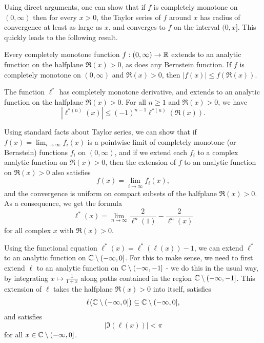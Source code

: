 \documentclass[letterpaper,11pt]{article}
\begin{document}
Using direct arguments, one can show that if $f$ is completely monotone on $(0,\infty)$ then for every $x > 0$, the Taylor series of $f$ around $x$ has radius of convergence at least as large as $x$, and converges to $f$ on the interval $(0,x]$. This quickly leads to the following result.

\begin{prop} Every completely monotone function $f : (0,\infty) \rightarrow \mathbb{R}$ extends to an analytic function on the halfplane $\Re(x) > 0$, as does any Bernstein function. If $f$ is completely monotone on $(0,\infty)$ and $\Re(x) > 0$, then $|f(x)| \le f(\Re(x))$.
\end{prop}

\begin{cor} The function $\ell^*$ has completely monotone derivative, and extends to an analytic function on the halfplane $\Re(x) > 0$. For all $n \ge 1$ and $\Re(x) > 0$, we have
\[
|\ell^{*(n)}(x)| \le (-1)^{n-1}\ell^{*(n)}(\Re(x)).
\]
\end{cor}

Using standard facts about Taylor series, we can show that if $f(x) = \lim_{i\rightarrow \infty} f_i(x)$ is a pointwise limit of completely monotone (or Bernstein) functions $f_i$ on $(0,\infty)$, and if we extend each $f_i$ to a complex analytic function on $\Re(x) > 0$, then the extension of $f$ to an analytic function on $\Re(x) > 0$ also satisfies
\[
f(x) = \lim_{i\rightarrow \infty} f_i(x),
\]
and the convergence is uniform on compact subsets of the halfplane $\Re(x) > 0$. As a consequence, we get the formula
\[
\ell^*(x) = \lim_{n\rightarrow \infty} \frac{2}{\ell^n(1)} - \frac{2}{\ell^n(x)}
\]
for all complex $x$ with $\Re(x) > 0$.

Using the functional equation $\ell^*(x) = \ell^*(\ell(x)) - 1$, we can extend $\ell^*$ to an analytic function on $\mathbb{C} \setminus (-\infty,0]$. For this to make sense, we need to first extend $\ell$ to an analytic function on $\mathbb{C}\setminus(-\infty,-1]$ - we do this in the usual way, by integrating $x \mapsto \frac{1}{1+x}$ along paths contained in the region $\mathbb{C}\setminus(-\infty,-1]$. This extension of $\ell$ takes the halfplane $\Re(x) > 0$ into itself, satisfies
\[
\ell\big(\mathbb{C} \setminus (-\infty,0]\big) \subseteq \mathbb{C} \setminus (-\infty,0],
\]
and satisfies
\[
|\Im(\ell(x))| < \pi
\]
for all $x \in \mathbb{C} \setminus (-\infty,0]$.
\end{document}
